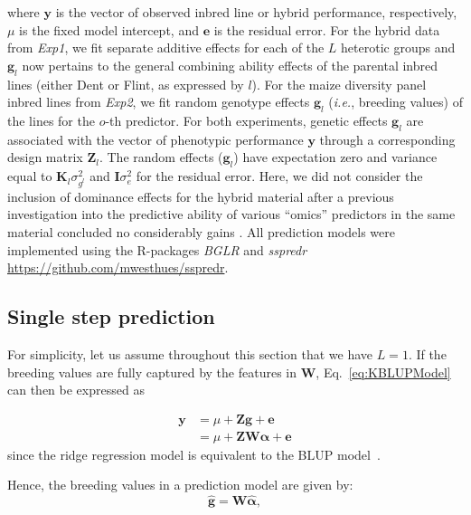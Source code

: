 \documentclass[12pt,titlepage]{article}
\begin{document}
where $\mathbf{y}$ is the vector of observed inbred line or hybrid performance,
respectively, $\mu$ is the fixed model intercept, and $\mathbf{e}$ is the 
residual error.
For the hybrid data from \textit{Exp1}, we fit separate additive effects for 
each of the $L$ heterotic groups and $\mathbf{g}_{l}$ now pertains to the 
general combining ability effects of the parental inbred lines (either Dent or 
Flint, as expressed by $l$).
For the maize diversity panel inbred lines from \textit{Exp2}, we fit random 
genotype effects $\mathbf{g}_{l}$ (\textit{i.e.}, breeding values) of the 
lines for the $o$-th predictor.
For both experiments, genetic effects $\mathbf{g}_{l}$ are associated with 
the vector of phenotypic performance $\mathbf{y}$ through a corresponding 
design matrix $\mathbf{Z}_{l}$.
The random effects ($\mathbf{g}_{l}$) have expectation zero and variance equal 
to $\mathbf{K}_{l} \sigma^{2}_{{g}^{l}}$ and $\mathbf{I} \sigma^2_{e}$ 
for the residual error.
Here, we did not consider the inclusion of dominance effects for the hybrid
material after a previous investigation into the predictive ability of various
``omics'' predictors in the same material concluded no considerably gains 
\cite{Westhues2017}.
All prediction models were implemented using the R-packages \textit{BGLR}
\cite{Perez2014} and \textit{sspredr}
\url{https://github.com/mwesthues/sspredr}. 


\subsection{Single step prediction}
For simplicity, let us assume throughout this section that we have $L=1$.
If the breeding values are fully captured by the features in $\mathbf{W}$,
Eq.~\ref{eq:KBLUPModel} can then be expressed as

\begin{align} \label{eq:KBLUPModelSimplified}
	\mathbf{y} &= \mu + \mathbf{Z} \mathbf{g} + \boldsymbol{e} \\
	&= \mu + \mathbf{Z} \mathbf{W} \boldsymbol{\alpha} + \boldsymbol{e}
\end{align}
\cite{Fernando2014} since the ridge regression model is equivalent to the BLUP
model~\cite{Ruppert2003}.


Hence, the breeding values in a prediction model are given by:
\begin{equation} \label{eq:mrnaebv}
	\mathbf{\hat{g}} = \mathbf{W}\boldsymbol{\hat{\alpha}},
\end{equation}
\end{document}
